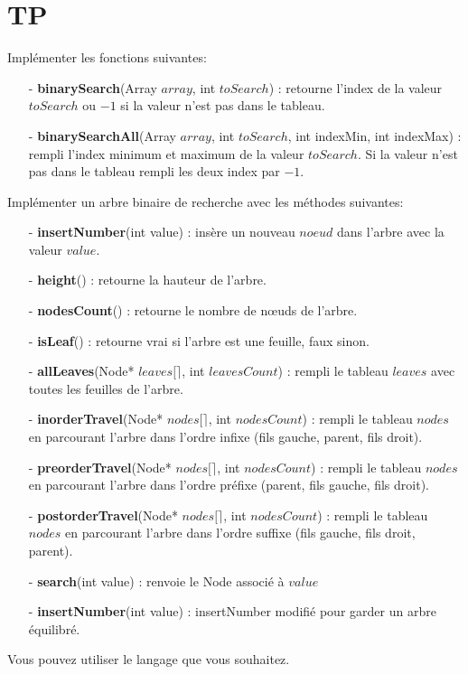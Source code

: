 \documentclass[11pt]{extarticle}
\begin{document}
\section{TP}
\noindent
Implémenter les fonctions suivantes:
\begin{itemize}
\item[ - \textbf{binarySearch}(Array $array$, int $toSearch$)]: retourne l'index de la valeur $toSearch$ ou $-1$ si la valeur n'est pas dans le tableau.
\item[ - \textbf{binarySearchAll}(Array $array$, int $toSearch$, int indexMin, int indexMax)]: rempli l'index minimum et maximum de la valeur $toSearch$. Si la valeur n'est pas dans le tableau rempli les deux index par $-1$.
\end{itemize}
Implémenter un arbre binaire de recherche avec les méthodes suivantes:
\begin{itemize}
\item[ - \textbf{insertNumber}(int value)]: insère un nouveau $noeud$ dans l'arbre avec la valeur $value$.
\item[ - \textbf{height}()]: retourne la hauteur de l'arbre.
\item[ - \textbf{nodesCount}()]: retourne le nombre de nœuds de l'arbre.
\item[ - \textbf{isLeaf}()]: retourne vrai si l'arbre est une feuille, faux sinon.
\item[ - \textbf{allLeaves}(Node* $leaves[ \rceil$, int $leavesCount$)]: rempli le tableau $leaves$ avec toutes les feuilles de l'arbre.
\item[ - \textbf{inorderTravel}(Node* $nodes[ \rceil$, int $nodesCount$)]: rempli le tableau $nodes$ en parcourant l'arbre dans l'ordre infixe (fils gauche, parent, fils droit).
\item[ - \textbf{preorderTravel}(Node* $nodes[ \rceil$, int $nodesCount$)]: rempli le tableau $nodes$ en parcourant l'arbre dans l'ordre préfixe (parent, fils gauche, fils droit).
\item[ - \textbf{postorderTravel}(Node* $nodes[ \rceil$, int $nodesCount$)]: rempli le tableau $nodes$ en parcourant l'arbre dans l'ordre suffixe (fils gauche, fils droit, parent).
\item[ - \textbf{search}(int value)]: renvoie le Node associé à $value$
\item[ - \textbf{insertNumber}(int value)]: insertNumber modifié pour garder un arbre équilibré.
\end{itemize}
Vous pouvez utiliser le langage que vous souhaitez.
\end{document}
